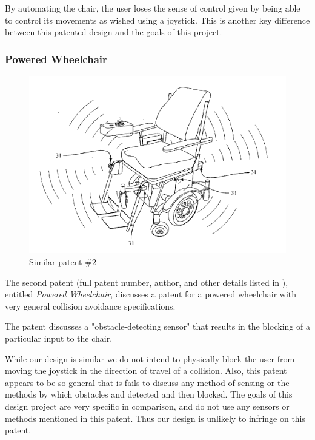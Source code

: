 \documentclass[oneside,final,a4paper]{report}
\begin{document}
By automating the chair, the user loses the sense of control given by being able to control its movements as wished using a joystick. This is another key difference between this patented design and the goals of this project.

\subsubsection{Powered Wheelchair}
\begin{figure}[hbt]
 \centering
 \includegraphics[scale=0.25]{patents2}
 \caption{Similar patent \#2 \cite{patent:power_wheelchair}}
\end{figure}

The second patent (full patent number, author, and other details listed in \cite{patent:power_wheelchair}), entitled \emph{Powered Wheelchair}, discusses a patent for a powered wheelchair with very general collision avoidance specifications.

The patent discusses a "obstacle-detecting sensor" that results in the blocking of a particular input to the chair.

While our design is similar we do not intend to physically block the user from moving the joystick in the direction of travel of a collision. Also, this patent appears to be so general that is fails to discuss any method of sensing or the methods by which obstacles and detected and then blocked. The goals of this design project are very specific in comparison, and do not use any sensors or methods mentioned in this patent. Thus our design is unlikely to infringe on this patent.
\end{document}
